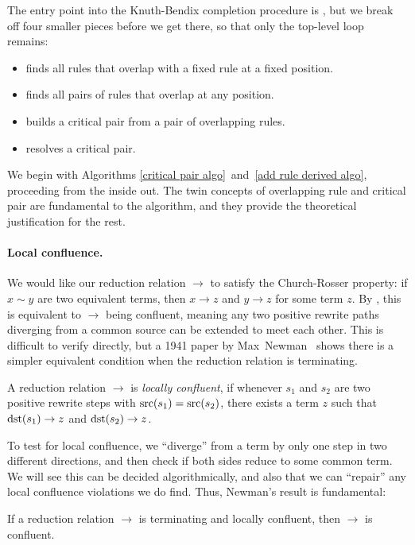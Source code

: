 \documentclass[../generics]{subfiles}
\begin{document}
The entry point into the Knuth-Bendix completion procedure is , but we break off four smaller pieces before we get there, so that only the top-level loop remains:
\begin{itemize}
\item {} finds all rules that overlap with a fixed rule at a fixed position.
\item {} finds all pairs of rules that overlap at any position.
\item {} builds a critical pair from a pair of overlapping rules.
\item {} resolves a critical pair.
\end{itemize}
We begin with Algorithms \ref{critical pair algo}~and~\ref{add rule derived algo}, proceeding from the inside out. The twin concepts of overlapping rule and critical pair are fundamental to the algorithm, and they provide the theoretical justification for the rest.

\paragraph{Local confluence.} We would like our reduction relation $\rightarrow$ to satisfy the Church-Rosser property: if $x\sim y$ are two equivalent terms, then $x\rightarrow z$ and $y\rightarrow z$ for some term $z$. By , this is equivalent to $\rightarrow$ being confluent, meaning any two positive rewrite paths diverging from a common source can be extended to meet each other. This is difficult to verify directly, but a 1941 paper by Max~Newman~\cite{newman} shows there is a simpler equivalent condition when the reduction relation is terminating.
\begin{definition}
A reduction relation $\rightarrow$ is \emph{locally confluent}, if whenever $s_1$ and $s_2$ are two positive rewrite steps with $\operatorname{src}(s_1)=\operatorname{src}(s_2)$, there exists a term $z$ such that $\operatorname{dst}(s_1)\rightarrow z$ and $\operatorname{dst}(s_2)\rightarrow z$.
\end{definition}
To test for local confluence, we ``diverge'' from a term by only one step in two different directions, and then check if both sides reduce to some common term. We will see this can be decided algorithmically, and also that we can ``repair'' any local confluence violations we do find. Thus, Newman's result is fundamental:
\begin{theorem}
If a reduction relation $\rightarrow$ is terminating and locally confluent, then $\rightarrow$ is confluent.
\end{theorem}
\end{document}
